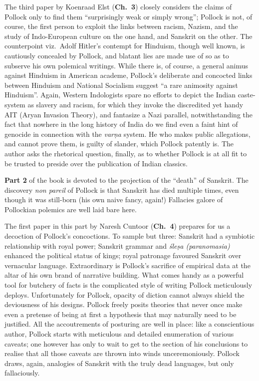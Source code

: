 The third paper by Koenraad Elst ({\bf Ch.~3}) closely considers the claims of Pollock only to find them “surprisingly weak or simply wrong”; Pollock is not, of course, the first person to exploit the links between racism, Nazism, and the study of Indo-European culture on the one hand, and Sanskrit on the other. The counterpoint viz.\ Adolf Hitler’s contempt for Hinduism, though well known, is cautiously concealed by Pollock, and blatant lies are made use of so as to subserve his own polemical writings. While there is, of course, a general animus against Hinduism in American academe, Pollock’s deliberate and concocted links between Hinduism and National Socialism suggest “a rare animosity against Hinduism”.  Again, Western Indologists spare no efforts to depict the Indian caste-system as slavery and racism, for which they invoke the discredited yet handy AIT (Aryan Invasion Theory), and fantasize a Nazi parallel, notwithstanding the fact that nowhere in the long history of India do we find even a faint hint of genocide in connection with the {\sl varṇa} system. He who makes public allegations, and cannot prove them, is guilty of slander, which Pollock patently is. The author asks the rhetorical question, finally, as to whether Pollock is at all fit to be trusted to preside over the publication of Indian classics.

{\bf Part 2} of the book is devoted to the projection of the “death” of Sanskrit. The discovery {\sl non pareil} of Pollock is that Sanskrit has died multiple times, even though it was still-born (his own naive fancy, again!) Fallacies galore of Pollockian polemics are well laid bare here.

The first paper in this part by Naresh Cuntoor ({\bf Ch.~4}) prepares for us a decoction of Pollock’s concoctions. To sample but three: Sanskrit had a symbiotic relationship with royal power; Sanskrit grammar and {\sl śleṣa (paranomasia)} enhanced the political status of kings; royal patronage favoured Sanskrit over vernacular language. Extraordinary is Pollock’s sacrifice of empirical data at the altar of his own brand of narrative building. What comes handy as a powerful tool for butchery of facts is the complicated style of writing Pollock meticulously deploys. Unfortunately for Pollock, opacity of diction cannot always shield the deviousness of his designs. Pollock freely posits theories that never once make even a pretense of being at first a hypothesis that may naturally need to be justified. All the accoutrements of posturing are well in place: like a conscientious author, Pollock starts with meticulous and detailed enumeration of various caveats; one however has only to wait to get to the section of his conclusions to realise that all those caveats are thrown into winds unceremoniously. Pollock draws, again, analogies of Sanskrit with the truly dead languages, but only fallaciously.


